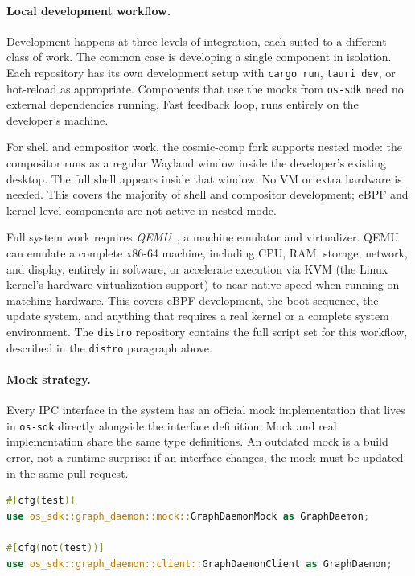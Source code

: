 \paragraph{Local development workflow.}
Development happens at three levels of integration, each suited to a different
class of work. The common case is developing a single component in isolation.
Each repository has its own development setup with \texttt{cargo run},
\texttt{tauri dev}, or hot-reload as appropriate. Components that use the mocks
from \texttt{os-sdk} need no external dependencies running. Fast feedback loop,
runs entirely on the developer's machine.

For shell and compositor work, the cosmic-comp fork supports nested mode: the
compositor runs as a regular Wayland window inside the developer's existing
desktop. The full shell appears inside that window. No VM or extra hardware is
needed. This covers the majority of shell and compositor development; eBPF and
kernel-level components are not active in nested mode.

Full system work requires \emph{QEMU}~\cite{qemu}, a machine emulator and
virtualizer. QEMU can emulate a complete x86-64 machine, including CPU, RAM, storage,
network, and display, entirely in software, or accelerate execution via KVM
(the Linux kernel's hardware virtualization support) to near-native speed when
running on matching hardware. This covers eBPF development, the boot sequence,
the update system, and anything that requires a real kernel or a complete
system environment. The \texttt{distro} repository contains the full script
set for this workflow, described in the \texttt{distro} paragraph above.

\paragraph{Mock strategy.}
Every IPC interface in the system has an official mock implementation that
lives in \texttt{os-sdk} directly alongside the interface definition. Mock and
real implementation share the same type definitions. An outdated mock is a
build error, not a runtime surprise: if an interface changes, the mock must be
updated in the same pull request.

\begin{lstlisting}[language=Rust, caption={Conditional mock usage in tests}]
#[cfg(test)]
use os_sdk::graph_daemon::mock::GraphDaemonMock as GraphDaemon;

#[cfg(not(test))]
use os_sdk::graph_daemon::client::GraphDaemonClient as GraphDaemon;
\end{lstlisting}

